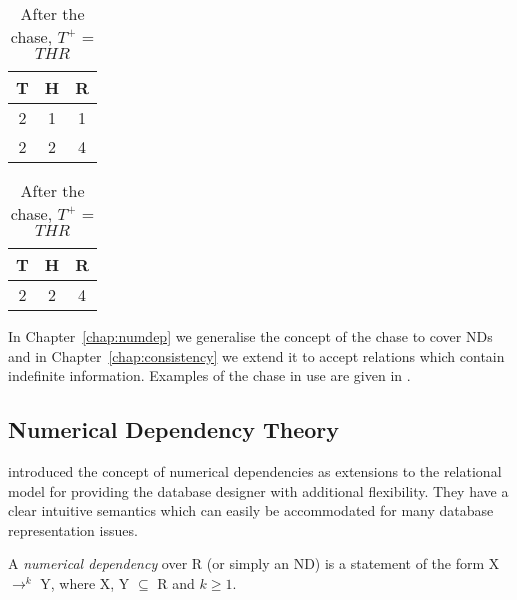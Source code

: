 {\line
\begin{table}[ht]
\begin{minipage}[b]{6cm}
\begin{center}
\begin{tabular}{|c|c|c|} \hline
 T & H & R \\ \hline
 2 & 1 & 1 \\
 2 & 2 & 4 \\  \hline
\end{tabular}
\end{center}
\caption{\label{tab:befcha}Before the chase}
\end{minipage}
\hfill
\begin{minipage}[b]{6cm}
\begin{center}
\begin{tabular}{|c|c|c|} \hline
 T & H & R \\ \hline
 2 & 2 & 4 \\  \hline
\end{tabular}
\end{center}
\caption{\label{tab:aftcha}After the chase, $T^+$ = $THR$}
\end{minipage}
\end{table}
}

In Chapter~\ref{chap:numdep} we generalise the concept of
the chase to cover NDs and in Chapter~\ref{chap:consistency} we extend it
to accept relations which contain indefinite information. Examples of
the chase in use are given in \cite{databasefound,Mann92}.


\subsection{Numerical Dependency Theory}

\cite{gm85a,gm85b} introduced the concept of numerical dependencies as
extensions to the relational model for providing the database designer
with additional flexibility.  They have a clear intuitive semantics
which can easily be accommodated for many database representation
issues.  
\begin{definition}
\begin{rm}
A {\em numerical dependency} over R (or simply an ND)
is a statement of the form X $\to^k$ Y, where X, Y $\subseteq$ R and $k \ge 1$.
\end{rm}
\end{definition}
\medskip


